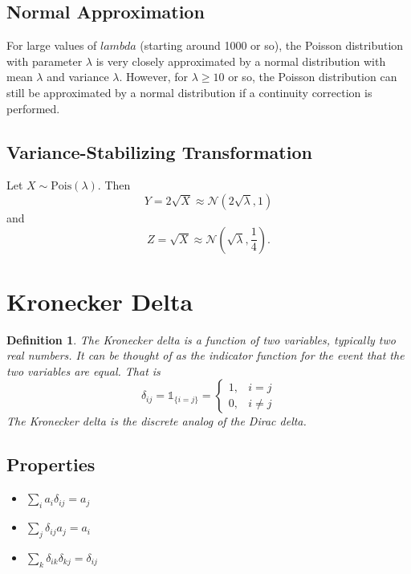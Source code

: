 \documentclass[1pt]{report}
\newtheorem{defn}[thm]{Definition}
\newcommand{\id}{\mathds{1}}
\newcommand{\<}{\langle}
\renewcommand{\>}{\rangle}
\newcommand{\NN}{\mathcal{N}}
\newcommand{\pois}{\text{Pois}}
\begin{document}
\subsection{Normal Approximation}
For large values of $lambda$ (starting around 1000 or so), the Poisson distribution with parameter $\lambda$ is very closely approximated by a normal distribution with mean $\lambda$ and variance $\lambda$. However, for $\lambda \geq 10$ or so, the Poisson distribution can still be approximated by a normal distribution if a continuity correction is performed.
\subsection{Variance-Stabilizing Transformation}
Let $X\sim \pois(\lambda)$. Then
$$Y = 2\sqrt{X} \approx \NN(2\sqrt\lambda, 1)$$
and
$$Z = \sqrt{X} \approx \NN\left(\sqrt\lambda, \frac{1}{4}\right).$$
\newpage
\section{Kronecker Delta}
\begin{defn}
The \emph{Kronecker delta} is a function of two variables, typically two real numbers. It can be thought of as the indicator function for the event that the two variables are equal. That is
$$\delta_{ij} = \id_{\{i = j\}} = \begin{cases} 1, & i = j \\ 0, &i \neq j \end{cases}$$
The Kronecker delta is the discrete analog of the Dirac delta.
\end{defn}
\subsection{Properties}
\begin{itemize}
\item $\sum\limits_i a_i \delta_{ij} = a_j$
\item $\sum\limits_j \delta_{ij} a_j = a_i$
\item $\sum\limits_k \delta_{ik}\delta_{kj} = \delta_{ij}$
\end{itemize}
\end{document}
